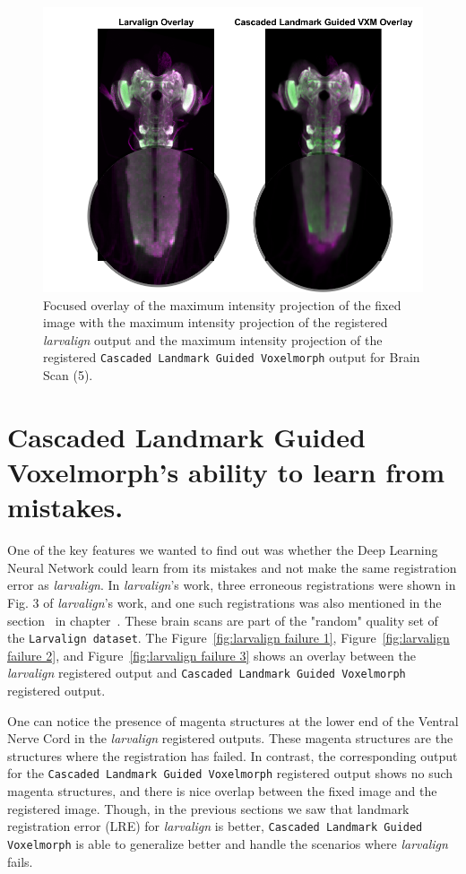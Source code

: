 \documentclass{book}
\begin{document}
	\begin{figure}[h!]
		\centering
		\includegraphics[width=0.7\columnwidth]{resources/chapter7/LRE_Visual/14c08c_overlay_zoomed.png}
		\caption{Focused overlay of the maximum intensity projection of the fixed image with the maximum intensity projection of the registered \textit{larvalign} output and the maximum intensity projection of the registered \texttt{Cascaded Landmark Guided Voxelmorph} output for Brain Scan (5).}
		\label{fig:14c08c_overlay}
	\end{figure}
	
	\newpage
	\section{Cascaded Landmark Guided Voxelmorph's ability to learn from mistakes.}
	One of the key features we wanted to find out was whether the Deep Learning Neural Network could learn from its mistakes and not make the same registration error as \textit{larvalign}. In \emph{larvalign}'s work, three erroneous registrations were shown in Fig. 3 of \textit{larvalign}'s work, and one such registrations was also mentioned in the section~ in chapter~. These brain scans are part of the "random" quality set of the \texttt{Larvalign dataset}. The Figure~\ref{fig:larvalign failure 1}, Figure~\ref{fig:larvalign failure 2}, and Figure~\ref{fig:larvalign failure 3} shows an overlay between the \textit{larvalign} registered output and \texttt{Cascaded Landmark Guided Voxelmorph} registered output.
	
	One can notice the presence of magenta structures at the lower end of the Ventral Nerve Cord in the \textit{larvalign} registered outputs. These magenta structures are the structures where the registration has failed. In contrast, the corresponding output for the \texttt{Cascaded Landmark Guided Voxelmorph} registered output shows no such magenta structures, and there is nice overlap between the fixed image and the registered image. Though, in the previous sections we saw that landmark registration error (LRE) for \textit{larvalign} is better, \texttt{Cascaded Landmark Guided Voxelmorph} is able to generalize better and handle the scenarios where \textit{larvalign} fails.
	
\end{document}
